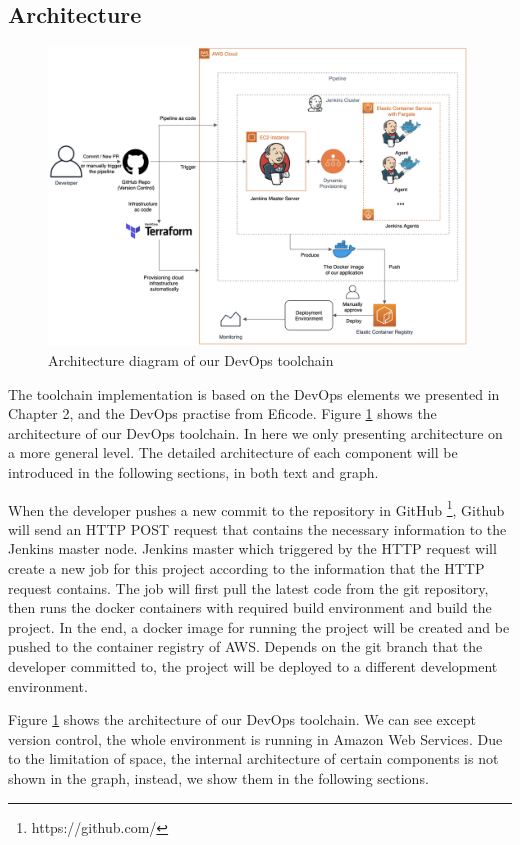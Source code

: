 \subsection{Architecture}
\begin{figure}[!htbp]
    \centering
    \includegraphics[width=0.99\textwidth]{pics/arch-med-jenkins.png}
    \caption{Architecture diagram of our DevOps toolchain}
    \label{fig:archjenkins}
\end{figure}
The toolchain implementation is based on the DevOps elements we presented in Chapter 2, and the DevOps practise from Eficode. Figure \ref{fig:archjenkins} shows the architecture of our DevOps toolchain. In here we only presenting architecture on a more general level. The detailed architecture of each component will be introduced in the following sections, in both text and graph.
\par
When the developer pushes a new commit to the repository in GitHub \footnote{https://github.com/}, Github will send an HTTP POST request that contains the necessary information to the Jenkins master node. Jenkins master which triggered by the HTTP request will create a new job for this project according to the information that the HTTP request contains. The job will first pull the latest code from the git repository, then runs the docker containers with required build environment and build the project. In the end, a docker image for running the project will be created and be pushed to the container registry of AWS. Depends on the git branch that the developer committed to, the project will be deployed to a different development environment.

\par
Figure \ref{fig:archjenkins} shows the architecture of our DevOps toolchain. We can see except version control, the whole environment is running in Amazon Web Services. Due to the limitation of space, the internal architecture of certain components is not shown in the graph, instead, we show them in the following sections.
